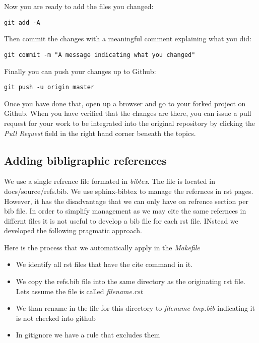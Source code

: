 Now you are ready to add the files you changed:

\begin{verbatim}
git add -A
\end{verbatim}

Then commit the changes with a meaningful comment explaining what you
did:

\begin{verbatim}
git commit -m "A message indicating what you changed"
\end{verbatim}

Finally you can push your changes up to Github:

\begin{verbatim}
git push -u origin master
\end{verbatim}

Once you have done that, open up a browser and go to your forked project
on Github. When you have verified that the changes are there, you can
issue a pull request for your work to be integrated into the original
repository by clicking the \emph{Pull Request} field in the right hand
corner beneath the topics.

\subsection{Adding bibligraphic
references}\label{adding-bibligraphic-references}

We use a single refrence file formated in \emph{bibtex}. The file is
located in docs/source/refs.bib. We use sphinx-bibtex to manage the
refernces in rst pages. However, it has the disadvantage that we can
only have on refrence section per bib file. In order to simplify
management as we may cite the same refernces in differnt files it is not
useful to develop a bib file for each rst file. INstead we developed the
following pragmatic approach.

Here is the process that we automatically apply in the \emph{Makefile}

\begin{itemize}
\tightlist
\item
  We identify all rst files that have the cite command in it.
\item
  We copy the refs.bib file into the same directory as the originating
  rst file. Lets assume the file is called \emph{filename.rst}
\item
  We than rename in the file for this directory to
  \emph{filename-tmp.bib} indicating it is not checked into github
\item
  In gitignore we have a rule that excludes them
\end{itemize}

